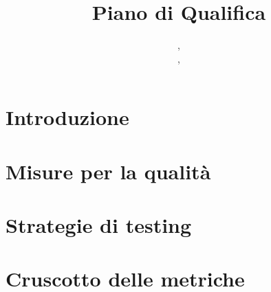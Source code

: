 \documentclass{classes/base}
\title{Piano di Qualifica}
\author{\marcob, \\ \ruth, \\ \matteo}
\begin{document}
	\maketitle
	\newpage
	
	\newpage
	\tableofcontents
	
	\newpage
	\section{Introduzione}
	
	
    \newpage
	\section{Misure per la qualità}
	
	
	\newpage
	\section{Strategie di testing}
	
	
	\newpage
	\section{Cruscotto delle metriche}
	
\end{document}
